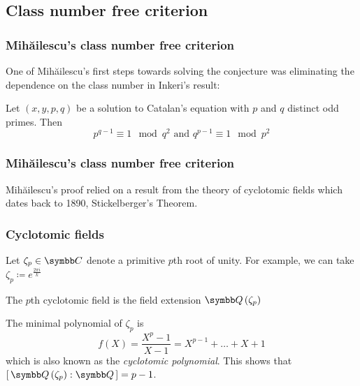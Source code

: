 \subsection{Class number free criterion}

\begin{frame}
\frametitle{Mihăilescu's class number free criterion}

One of Mihăilescu's first steps towards solving the conjecture was eliminating the dependence on the class number in Inkeri's result:
\begin{theorem}[Mihăilescu, 2000]
Let \(\left(x, y, p, q\right)\) be a solution to Catalan's equation with \(p\) and \(q\) distinct odd primes. Then
\[
    p^{q - 1} \equiv 1 \mod{q^2} \text{ and } q^{p - 1} \equiv 1 \mod{p^2}
\]
\end{theorem}
\end{frame}

\begin{frame}
\frametitle{Mihăilescu's class number free criterion}

Mihăilescu's proof \cite{Mihailescu2003_ClassNumberFreeCriterion} relied on a result from the theory of cyclotomic fields which dates back to 1890, Stickelberger's Theorem.
\end{frame}

\begin{frame}
\frametitle{Cyclotomic fields}

Let \(\zeta_p \in \complex\) denote a primitive \(p\)th root of unity. For example, we can take \(\zeta_p \coloneq e^{\frac{2 \pi i}{k}}\)

\begin{definition}
The \(p\)th cyclotomic field is the field extension \(\rationals\left(\zeta_p\right)\)
\end{definition}

\begin{remark}
The minimal polynomial of \(\zeta_p\) is
\[
    f(X) = \frac{X^p - 1}{X - 1} = X^{p - 1} + \dots + X + 1
\]
which is also known as the \emph{cyclotomic polynomial}. This shows that \(\left[\, \rationals\left(\zeta_p\right) : \rationals \,\right] = p - 1\).
\end{remark}
\end{frame}

